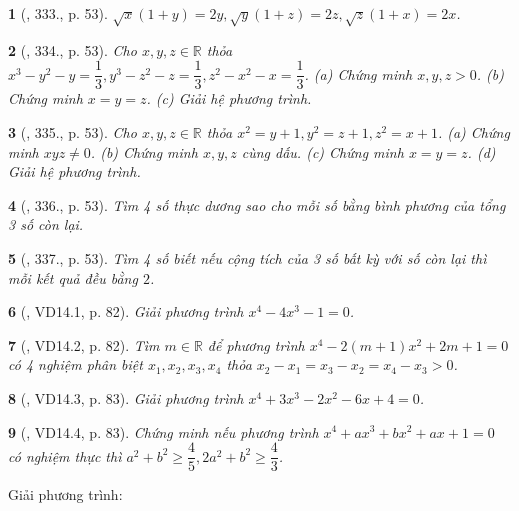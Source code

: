 \documentclass{article}
\newtheorem{baitoan}{}
\begin{document}
\begin{baitoan}[\cite{Binh_Toan_9_tap_2}, 333., p. 53]
	$\sqrt{x}(1 + y) = 2y,\sqrt{y}(1 + z) = 2z,\sqrt{z}(1 + x) = 2x$.
\end{baitoan}

\begin{baitoan}[\cite{Binh_Toan_9_tap_2}, 334., p. 53]
	Cho $x,y,z\in\mathbb{R}$ thỏa $x^3 - y^2 - y = \dfrac{1}{3},y^3 - z^2 - z = \dfrac{1}{3},z^2 - x^2 - x = \dfrac{1}{3}$. (a) Chứng minh $x,y,z > 0$. (b) Chứng minh $x = y = z$. (c) Giải hệ phương trình.
\end{baitoan}

\begin{baitoan}[\cite{Binh_Toan_9_tap_2}, 335., p. 53]
	Cho $x,y,z\in\mathbb{R}$ thỏa $x^2 = y + 1,y^2 = z + 1,z^2 = x + 1$. (a) Chứng minh $xyz\ne0$. (b) Chứng minh $x,y,z$ cùng dấu. (c) Chứng minh $x = y = z$. (d) Giải hệ phương trình.
\end{baitoan}

\begin{baitoan}[\cite{Binh_Toan_9_tap_2}, 336., p. 53]
	Tìm 4 số thực dương sao cho mỗi số bằng bình phương của tổng 3 số còn lại.
\end{baitoan}

\begin{baitoan}[\cite{Binh_Toan_9_tap_2}, 337., p. 53]
	Tìm 4 số biết nếu cộng tích của 3 số bất kỳ với số còn lại thì mỗi kết quả đều bằng $2$.
\end{baitoan}

\begin{baitoan}[\cite{TLCT_THCS_Toan_9_dai_so}, VD14.1, p. 82]
	Giải phương trình $x^4 - 4x^3 - 1 = 0$.
\end{baitoan}

\begin{baitoan}[\cite{TLCT_THCS_Toan_9_dai_so}, VD14.2, p. 82]
	Tìm $m\in\mathbb{R}$ để phương trình $x^4 - 2(m + 1)x^2 + 2m + 1 = 0$ có 4 nghiệm phân biệt $x_1,x_2,x_3,x_4$ thỏa $x_2 - x_1 = x_3 - x_2 = x_4 - x_3 > 0$.
\end{baitoan}

\begin{baitoan}[\cite{TLCT_THCS_Toan_9_dai_so}, VD14.3, p. 83]
	Giải phương trình $x^4 + 3x^3 - 2x^2 - 6x + 4 = 0$.
\end{baitoan}

\begin{baitoan}[\cite{TLCT_THCS_Toan_9_dai_so}, VD14.4, p. 83]
	Chứng minh nếu phương trình $x^4 + ax^3 + bx^2 + ax + 1 = 0$ có nghiệm thực thì $a^2 + b^2\ge\dfrac{4}{5},2a^2 + b^2\ge\dfrac{4}{3}$.
\end{baitoan}
Giải phương trình:
\end{document}
